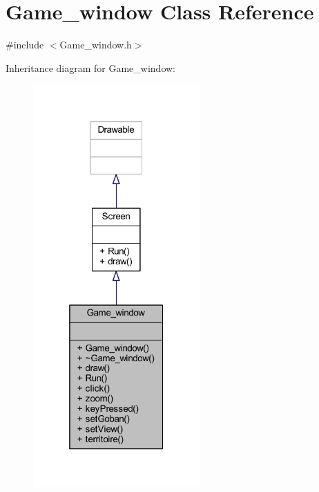 \hypertarget{class_game__window}{}\section{Game\+\_\+window Class Reference}
\label{class_game__window}


{\ttfamily \#include $<$Game\+\_\+window.\+h$>$}



Inheritance diagram for Game\+\_\+window\+:\nopagebreak
\begin{figure}[H]
\begin{center}
\leavevmode
\includegraphics[width=181pt]{class_game__window__inherit__graph}
\end{center}
\end{figure}



